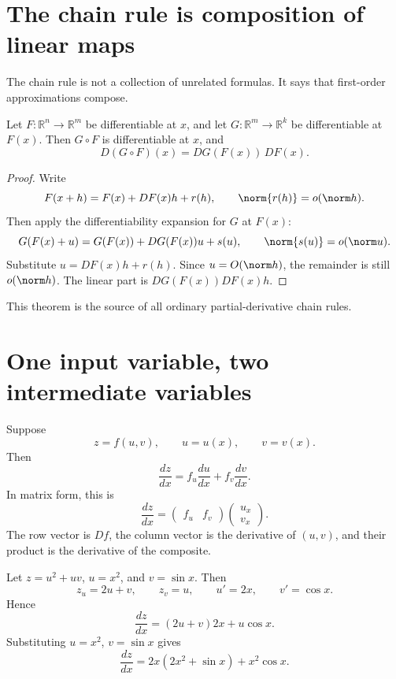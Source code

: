 
\section{The chain rule is composition of linear maps}

The chain rule is not a collection of unrelated formulas.  It says that first-order approximations compose.

\begin{theorem}
Let \(F:\mathbb R^n\to\mathbb R^m\) be differentiable at \(x\), and let \(G:\mathbb R^m\to\mathbb R^k\) be differentiable at \(F(x)\).  Then \(G\circ F\) is differentiable at \(x\), and
\[
  D(G\circ F)(x)=DG(F(x))\,DF(x).
\]
\end{theorem}

\begin{proof}
Write
\[
  F(x+h)=F(x)+DF(x)h+r(h),\qquad \norm{r(h)}=o(\norm h).
\]
Then apply the differentiability expansion for \(G\) at \(F(x)\):
\[
  G(F(x)+u)=G(F(x))+DG(F(x))u+s(u),
  \qquad \norm{s(u)}=o(\norm u).
\]
Substitute \(u=DF(x)h+r(h)\).  Since \(u=O(\norm h)\), the remainder is still \(o(\norm h)\).  The linear part is \(DG(F(x))DF(x)h\).
\end{proof}

This theorem is the source of all ordinary partial-derivative chain rules.

\section{One input variable, two intermediate variables}

Suppose
\[
  z=f(u,v),\qquad u=u(x),\qquad v=v(x).
\]
Then
\[
  \frac{dz}{dx}=f_u\frac{du}{dx}+f_v\frac{dv}{dx}.
\]
In matrix form, this is
\[
  \frac{dz}{dx}
  =
  \begin{pmatrix}f_u&f_v\end{pmatrix}
  \begin{pmatrix}u_x\\ v_x\end{pmatrix}.
\]
The row vector is \(Df\), the column vector is the derivative of \((u,v)\), and their product is the derivative of the composite.

\begin{example}
Let \(z=u^2+uv\), \(u=x^2\), and \(v=\sin x\).  Then
\[
  z_u=2u+v,\qquad z_v=u,\qquad u'=2x,\qquad v'=\cos x.
\]
Hence
\[
  \frac{dz}{dx}=(2u+v)2x+u\cos x.
\]
Substituting \(u=x^2\), \(v=\sin x\) gives
\[
  \frac{dz}{dx}=2x(2x^2+\sin x)+x^2\cos x.
\]
\end{example}

